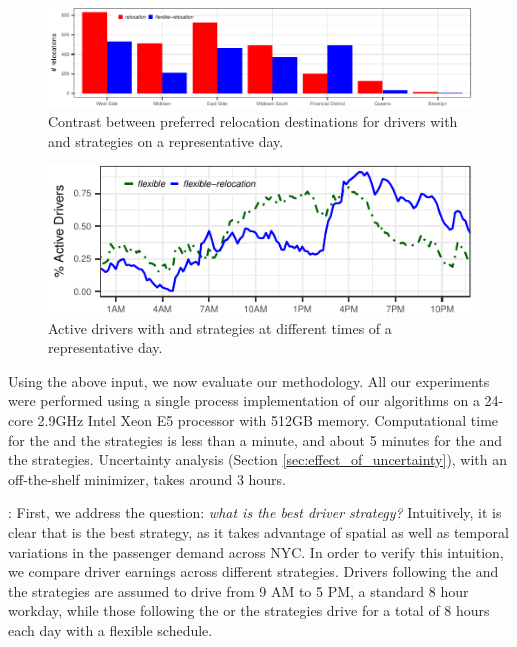 \begin{figure}
	\centering
	\includegraphics{figures/relocation_endzones.pdf}
	\caption{Contrast between preferred relocation destinations for drivers with 
	{\relocation} and {\relocationflexible} strategies on a representative day.}
	\label{fig:relocation_endzones}
\end{figure}

\begin{figure}[h]
	\centering
	\includegraphics{figures/simulated_schedules.pdf}
	\caption{Active drivers with {\flexible} and {\relocationflexible}
	strategies at different times of a representative day.}
	\label{fig:simulated_schedules}
\end{figure}

Using the above input, we now evaluate our methodology. All our experiments were performed using a single process implementation of our algorithms on a 24-core 2.9GHz Intel Xeon E5 processor with 512GB memory. Computational time for the {\naive} and the {\relocation} strategies is less than a minute, and about 5 minutes for the {\flexible} and the {\relocationflexible} strategies. Uncertainty analysis (Section \ref{sec:effect_of_uncertainty}), with an off-the-shelf minimizer, takes around 3 hours.

: First, we address the question: \textit{what is the best driver strategy?} Intuitively, it is clear that {\relocationflexible} is the best strategy, as it takes advantage of spatial as well as temporal variations in the passenger demand across NYC. In order to verify this intuition, we compare driver earnings across different strategies. Drivers following the {\naive} and the {\relocation} strategies are assumed to drive from 9 AM to 5 PM, a standard 8 hour workday, while those following the {\flexible} or the {\relocationflexible} strategies drive for a total of 8 hours each day with a flexible schedule.

